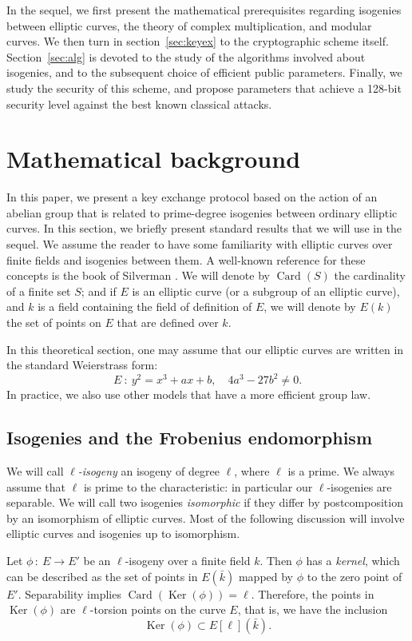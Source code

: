 \documentclass{article}
\newcommand{\from}{\ensuremath{\,:\ }}
\theoremstyle{definition}
\DeclareMathOperator{\Ker}{Ker}
\DeclareMathOperator{\Card}{Card}
\begin{document}
In the sequel, we first present the mathematical prerequisites regarding
isogenies between elliptic curves, the theory of complex multiplication,
and modular curves. We then turn in section~\ref{sec:keyex} to the
cryptographic scheme itself. Section~\ref{sec:alg} is devoted to the
study of the algorithms involved about isogenies, and to the
subsequent choice of efficient public parameters. Finally, we study the
security of this scheme, and propose parameters that achieve a 128-bit
security level against the best known classical attacks.

\section{Mathematical background}
\label{sec:math}

In this paper, we present a key exchange protocol based on the action of
an abelian group that is related to prime-degree isogenies between ordinary
elliptic curves. In this section, we briefly present standard results that
we will use in the sequel.
We assume the reader to have some familiarity with elliptic curves over 
finite fields and isogenies between them. A well-known reference for these 
concepts is the book of Silverman \cite{}.
We will denote by $\Card(S)$ the cardinality of
a finite set $S$; and if $E$ is an elliptic curve (or a subgroup of an
elliptic curve), and $k$ is a field containing the field of
definition of $E$, we will denote by $E(k)$ the set of
points on $E$ that are defined over $k$.

In this theoretical section, one may assume that our elliptic curves are
written in the standard Weierstrass form:
\[
E\ :\ y^2 = x^3 + a x + b,\quad 4a^3 - 27b^2 \neq 0.
\]
In practice, we also use other models that have a more efficient group law.

\subsection{Isogenies and the Frobenius endomorphism}


 We will call 
\emph{$\ell$-isogeny} an isogeny of degree $\ell$, where $\ell$ is a prime.
We always assume that $\ell$ is prime to the characteristic:
in particular our $\ell$-isogenies are separable. We will call two isogenies
\emph{isomorphic} if they differ by postcomposition by an isomorphism
of elliptic curves. Most of the following discussion will involve elliptic
curves and isogenies up to isomorphism.

Let $\phi\from E\to E'$ be an $\ell$-isogeny over a finite field $k$. Then 
$\phi$ has a \emph{kernel}, which can be described as the set of
points in $E(\bar{k})$ mapped by $\phi$ to the zero point of $E'$.
Separability implies
$
\Card(\Ker(\phi)) = \ell.
$
Therefore, the points in $\Ker(\phi)$ are $\ell$-torsion points on the curve 
$E$, that is, we have the inclusion
\[
\Ker(\phi) \subset E[\ell](\bar{k}).
\]
\end{document}
